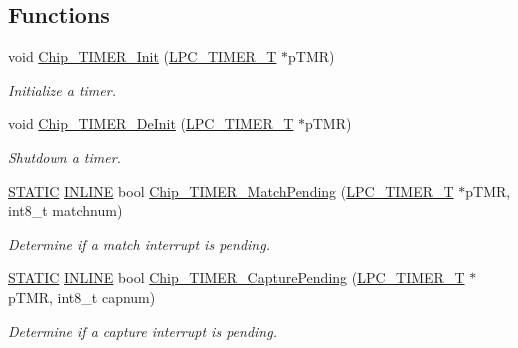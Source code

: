 \subsection*{Functions}
\begin{DoxyCompactItemize}
\item 
void \hyperlink{group___t_i_m_e_r__18_x_x__43_x_x_gac2ca0aff00ae8a651e129afba400c833}{Chip\+\_\+\+T\+I\+M\+E\+R\+\_\+\+Init} (\hyperlink{struct_l_p_c___t_i_m_e_r___t}{L\+P\+C\+\_\+\+T\+I\+M\+E\+R\+\_\+T} $\ast$p\+T\+MR)
\begin{DoxyCompactList}\small\item\em Initialize a timer. \end{DoxyCompactList}\item 
void \hyperlink{group___t_i_m_e_r__18_x_x__43_x_x_gaa52f3e33303d7d4f1e2325586a21a5c0}{Chip\+\_\+\+T\+I\+M\+E\+R\+\_\+\+De\+Init} (\hyperlink{struct_l_p_c___t_i_m_e_r___t}{L\+P\+C\+\_\+\+T\+I\+M\+E\+R\+\_\+T} $\ast$p\+T\+MR)
\begin{DoxyCompactList}\small\item\em Shutdown a timer. \end{DoxyCompactList}\item 
\hyperlink{group___l_p_c___types___public___macros_ga10b2d890d871e1489bb02b7e70d9bdfb}{S\+T\+A\+T\+IC} \hyperlink{spifi__18xx__43xx_8h_a2eb6f9e0395b47b8d5e3eeae4fe0c116}{I\+N\+L\+I\+NE} bool \hyperlink{group___t_i_m_e_r__18_x_x__43_x_x_ga0d61fd61d18ba82d44f1b5fec2e48a76}{Chip\+\_\+\+T\+I\+M\+E\+R\+\_\+\+Match\+Pending} (\hyperlink{struct_l_p_c___t_i_m_e_r___t}{L\+P\+C\+\_\+\+T\+I\+M\+E\+R\+\_\+T} $\ast$p\+T\+MR, int8\+\_\+t matchnum)
\begin{DoxyCompactList}\small\item\em Determine if a match interrupt is pending. \end{DoxyCompactList}\item 
\hyperlink{group___l_p_c___types___public___macros_ga10b2d890d871e1489bb02b7e70d9bdfb}{S\+T\+A\+T\+IC} \hyperlink{spifi__18xx__43xx_8h_a2eb6f9e0395b47b8d5e3eeae4fe0c116}{I\+N\+L\+I\+NE} bool \hyperlink{group___t_i_m_e_r__18_x_x__43_x_x_gae9a2575f38b3acaf6255caf15c5b65df}{Chip\+\_\+\+T\+I\+M\+E\+R\+\_\+\+Capture\+Pending} (\hyperlink{struct_l_p_c___t_i_m_e_r___t}{L\+P\+C\+\_\+\+T\+I\+M\+E\+R\+\_\+T} $\ast$p\+T\+MR, int8\+\_\+t capnum)
\begin{DoxyCompactList}\small\item\em Determine if a capture interrupt is pending. \end{DoxyCompactList}\item 

\end{DoxyCompactItemize}

